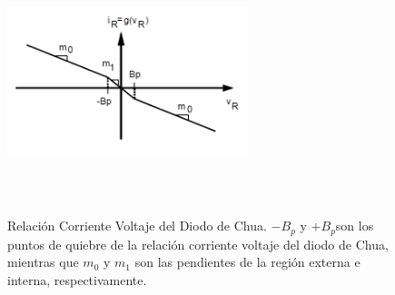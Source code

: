 \documentclass{rbf}
\begin{document}
\begin{figure}
    \centering
    \includegraphics[width=7cm,height=7cm]{DiodoChua.png}\\
    \caption{Relación Corriente Voltaje del Diodo de Chua. $-B_{p}$ y $+B_{p}$son los puntos de quiebre de la relación corriente voltaje del diodo de Chua, mientras que $m_{0}$ y $m_{1}$ son las pendientes de la región externa e interna, respectivamente.} 
    \label{fig:diodo teórico}
\end{figure}
\end{document}
